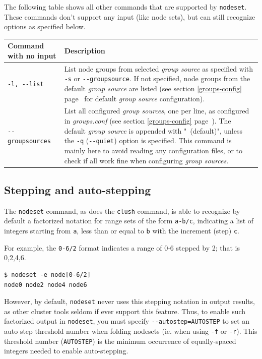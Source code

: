\documentclass[english,a4paper]{csuserguide}
\newcommand{\nodeset}{\texttt{nodeset}\xspace}
\newcommand{\clush}{\texttt{clush}\xspace}
\begin{document}
The following table shows all other commands that are supported by \nodeset. These commands don't support any input (like node sets), but can still recognize options as specified below.
\label{nodeset-grpcmd}

\begin{center}
\label{nodeset-cmds2}
\begin{tabular}{|p{3.2cm}|p{13.2cm}|} 
\hline 
\textbf{Command with no input} & \textbf{Description} \\
\hline
\verb+-l, --list+ & List node groups from selected \textit{group source} as specified with \verb+-s+ or \verb+--groupsource+. If not specified, node groups from the default \textit{group source} are listed (see section \ref{groups-config} page~\pageref{groups-config} for default \textit{group source} configuration).\\
\hline
\verb+--groupsources+ & List all configured \textit{group sources}, one per line, as configured in \textit{groups.conf} (see section \ref{groups-config} page~\pageref{groups-config}). The default \textit{group source} is appended with \mbox{" (default)"}, unless the \verb+-q+ (\verb+--quiet+) option is specified. This command is  mainly here to avoid reading any configuration files, or to check if all work fine when configuring \textit{group sources}.\\
\hline
\end{tabular}
\end{center}

\subsection{Stepping and auto-stepping}
\label{nodeset-stepping}

The \nodeset command, as does the \clush command, is able to recognize by default a factorized notation for range sets of the form \verb+a-b/c+, indicating a list of integers starting from \verb+a+, less than or equal to \verb+b+ with the increment (step) \verb+c+.

For example, the \verb+0-6/2+ format indicates a range of 0-6 stepped by 2; that is 0,2,4,6.
\medskip
\begin{lstlisting}[breaklines=true, breakatwhitespace=true] 
$ nodeset -e node[0-6/2]
node0 node2 node4 node6
\end{lstlisting}

However, by default, \nodeset never uses this stepping notation in output results, as other cluster tools seldom if ever support this feature. Thus, to enable such factorized output in \nodeset, you must specify \verb+--autostep=AUTOSTEP+ to set an auto step threshold number when folding nodesets (ie. when using \verb+-f+ or \verb+-r+). This threshold number (\verb+AUTOSTEP+) is the minimum occurrence of equally-spaced integers needed to enable auto-stepping.
\end{document}

